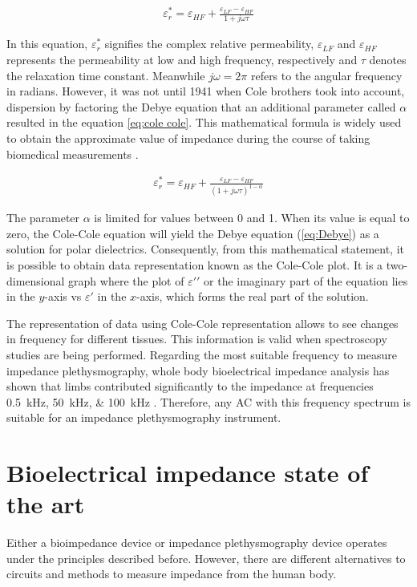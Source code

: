 \begin{align}
	\label{eq:Debye}
	\varepsilon_r^* = \varepsilon_{HF} + \frac{\varepsilon_{LF} - \varepsilon_{HF}}{1 + j \omega \tau}
\end{align}

In this equation, $\varepsilon_r^*$ signifies the complex relative permeability, $\varepsilon_{LF}$ and $\varepsilon_{HF}$ represents the permeability at low and high frequency, respectively and $\tau$ denotes the relaxation time constant. Meanwhile $j \omega =2 \pi$ refers to the angular frequency in radians. However, it was not until 1941 when Cole brothers took into account, dispersion by factoring the Debye equation that an additional parameter called $\alpha$ resulted in the equation \ref{eq:cole cole}. This mathematical formula is widely used to obtain the approximate value of impedance during the course of taking biomedical measurements \cite{cole1941dispersion}.

\begin{align}
	\label{eq:cole cole}
	\varepsilon_r^* = \varepsilon_{HF} + \frac{\varepsilon_{LF} - \varepsilon_{HF}}{(1 + j \omega \tau)^{1-\alpha}}
\end{align}

The parameter $\alpha$ is limited for values between 0 and 1. When its value is equal to zero, the Cole-Cole equation will yield the Debye equation (\ref{eq:Debye}) as a solution for polar dielectrics. Consequently, from this mathematical statement, it is possible to obtain data representation known as the Cole-Cole plot. It is a two-dimensional graph where the plot of $\varepsilon \prime\prime$ or the imaginary part of the equation lies in the $y$-axis vs $\varepsilon \prime$ in the $x$-axis, which forms the real part of the solution. 

The representation of data using Cole-Cole representation allows to see changes in frequency for different tissues. This information is valid when spectroscopy studies are being performed. Regarding the most suitable frequency to measure impedance plethysmography, whole body bioelectrical impedance analysis has shown that limbs contributed significantly to the impedance at frequencies \SIlist{0.5; 50; 100}{\kHz} \cite{bracco1996segmental}. Therefore, any AC with this frequency spectrum is suitable for an impedance plethysmography instrument. 

\section{Bioelectrical impedance state of the art} %
\label{section impedance state art}
Either a bioimpedance device or impedance plethysmography device operates under the principles described before. However, there are different alternatives to circuits and methods to measure impedance from the human body.  

